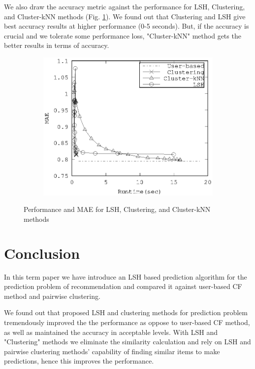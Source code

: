 \documentclass[conference]{IEEEtran}
\begin{document}
We also draw the accuracy metric against the performance for LSH, Clustering, 
and Cluster-kNN methods (Fig. \ref{fig:performance-all}). We found out that 
Clustering and LSH give best accuracy results at higher performance (0-5 
seconds). But, if the accuracy is crucial and we tolerate some performance loss,
"Cluster-kNN" method gets the better results in terms of accuracy.

\begin{figure}
        \centering
        \begin{subfigure}[b]{0.45\textwidth}
                \includegraphics[width=\textwidth]{charts/performance-all.eps}
        \end{subfigure}
        \caption{Performance and MAE for LSH, Clustering, and Cluster-kNN methods}
        \label{fig:performance-all}
\end{figure}


\section{Conclusion}
\label{sec:conclusion}

In this term paper we have introduce an LSH based prediction algorithm for 
the prediction problem of recommendation and compared it against user-based CF
method and pairwise clustering.

We found out that proposed LSH and clustering methods for prediction problem
tremendously improved the the performance as oppose to user-based CF method, as
well as maintained the accuracy in acceptable levels. With LSH and "Clustering"
methods we eliminate the similarity calculation and rely on LSH and pairwise 
clustering methods' capability of finding similar items to make predictions, 
hence this improves the performance. 
\end{document}
